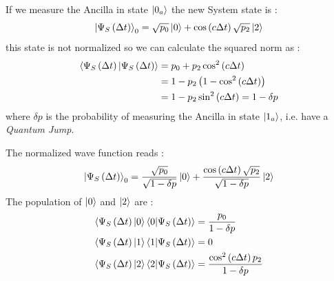 \documentclass[a4paper,12pt]{article}
\begin{document}
	If we measure the Ancilla in state $ \ket{0_{a}} $ the new System state is :
	\begin{equation}
		\ket{\Psi_{S} \left( \Delta t \right)}_{0} = \sqrt{p_{0}} \ket{0} + \cos \left( c \Delta t \right) \sqrt{p_{2}} \ket{2} 
	\end{equation}
	this state is not normalized so we can calculate the squared norm as :
	\begin{align}
		\braket{\Psi_{S} \left( \Delta t \right) | \Psi_{S} \left( \Delta t \right)} &= p_{0} + p_{2} \cos^{2} \left( c \Delta t \right)  \notag \\
		&= 1 - p_{2} \left( 1 - \cos^{2} \left( c \Delta t \right) \right) \notag \\
		&= 1 - p_{2} \sin^{2} \left( c \Delta t \right) =  1 - \delta p
	\end{align}
	where $ \delta p $ is the probability of measuring the Ancilla in state $ \ket{1_{a}} $, i.e. have a \textit{Quantum Jump}.
	
	The normalized wave function reads : 
	\begin{equation}
		\ket{\Psi_{S} \left( \Delta t \right)}_{0} = \frac{\sqrt{p_{0}}}{\sqrt{1 - \delta p}} \ket{0} + \frac{\cos \left( c \Delta t \right) \sqrt{p_{2}}}{\sqrt{1 - \delta p}} \ket{2}
	\end{equation}
	The population of $ \ket{0} $ and $ \ket{2} $ are : 
	\begin{align}
		\braket{\Psi_{S} \left( \Delta t \right) | 0 } \braket{0 | \Psi_{S} \left( \Delta t \right) } &= \frac{p_{0}}{1 - \delta p} \\ 
		\braket{\Psi_{S} \left( \Delta t \right) | 1 } \braket{1 | \Psi_{S} \left( \Delta t \right) } &= 0 \\
		\braket{\Psi_{S} \left( \Delta t \right) | 2 } \braket{ 2 | \Psi_{S} \left( \Delta t \right) } &= \frac{ \cos^{2} \left( c \Delta t \right) p_{2}}{1 - \delta p}
	\end{align}
\end{document}
